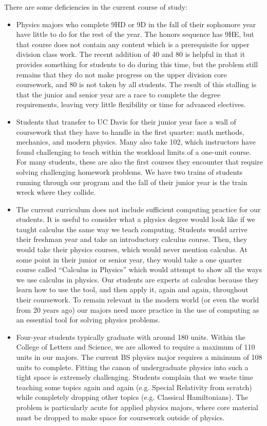 \documentclass[12pt]{article}
\begin{document}
There are some deficiencies in the current course of study:
\begin{itemize}

\item Physics majors who complete 9HD or 9D in the fall of their
  sophomore year have little to do for the rest of the year.  The
  honors sequence has 9HE, but that course does not contain any
  content which is a prerequisite for upper division class work.  The
  recent addition of 40 and 80 is helpful in that it provides
  something for students to do during this time, but the problem still
  remains that they do not make progress on the upper division core
  coursework, and 80 is not taken by all students.  The result of
  this stalling is that the junior and senior year are a race to
  complete the degree requirements, leaving very little flexibility or
  time for advanced electives.

\item Students that transfer to UC Davis for their junior year face a
  wall of coursework that they have to handle in the first quarter:
  math methods, mechanics, and modern physics.  Many also take 102,
  which instructors have found challenging to teach within the
  workload limits of a one-unit course.  For many students, these are
  also the first courses they encounter that require solving
  challenging homework problems.  We have two trains of students
  running through our program and the fall of their junior year is the
  train wreck where they collide.

\item The current curriculum does not include sufficient computing
  practice for our students.  It is useful to consider what a physics
  degree would look like if we taught calculus the same way we teach
  computing.  Students would arrive their freshman year and take an
  introductory calculus course.  Then, they would take their physics
  courses, which would never mention calculus.  At some point in their
  junior or senior year, they would take a one quarter course called
  ``Calculus in Physics'' which would attempt to show all the ways we
  use calculus in physics.  Our students are experts at calculus
  because they learn how to use the tool, and then apply it, again and
  again, throughout their coursework.  To remain relevant in the
  modern world (or even the world from 20 years ago) our majors need
  more practice in the use of computing as an essential tool for
  solving physics problems.

\item Four-year students typically graduate with around 180 units.
  Within the College of Letters and Science, we are allowed to require
  a maximum of 110 units in our majors.  The current BS physics major
  requires a minimum of 108 units to complete.  Fitting the canon of
  undergraduate physics into such a tight space is extremely
  challenging.  Students complain that we waste time teaching some
  topics again and again (e.g. Special Relativity from scratch) while
  completely dropping other topics (e.g. Classical Hamiltonians).  The
  problem is particularly acute for applied physics majors, where core
  material must be dropped to make space for coursework outside of
  physics.


\end{itemize}
\end{document}
